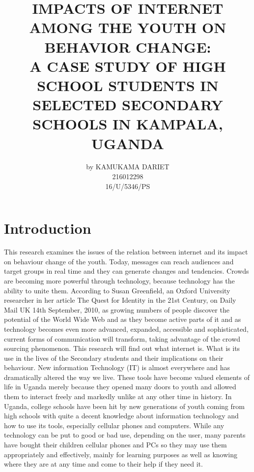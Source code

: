 \documentclass[10pt,letterpaper]{article}
\begin{document}
\title{IMPACTS OF INTERNET AMONG THE YOUTH ON BEHAVIOR CHANGE:\\ 
A CASE STUDY OF HIGH SCHOOL STUDENTS IN SELECTED SECONDARY SCHOOLS IN KAMPALA, UGANDA
}
\author{by KAMUKAMA DARIET  \\ 216012298 \\  16/U/5346/PS}
\maketitle
\section{Introduction }
This research examines the issues of the relation between internet and its impact on behaviour change of the youth. Today, messages can reach audiences and target groups in real time and they can generate changes and tendencies. Crowds are becoming more powerful through technology, because technology has the ability to unite them.
According to Susan Greenfield, an Oxford University researcher in her article The Quest for Identity in the 21st Century, on Daily Mail UK 14th September, 2010, as growing numbers of people discover the potential of the World Wide Web and as they become active parts of it and as technology becomes even more advanced, expanded, accessible and sophisticated, current forms of communication will transform, taking advantage of the crowd sourcing phenomenon.
This research will find out what internet is. What is its use in the lives of the Secondary students and their implications on their behaviour. New information Technology (IT) is almost everywhere and has dramatically altered the way we live. These tools have become valued elements of life in Uganda merely because they opened many doors to youth and allowed them to interact freely and markedly unlike at any other time in history. In Uganda, college schools have been hit by new generations of youth coming from high schools with quite a decent knowledge about information technology and how to use its tools, especially cellular phones and computers. While any technology can be put to good or bad use, depending on the user, many parents have bought their children cellular phones and PCs so they may use them appropriately and effectively, mainly for learning purposes as well as knowing where they are at any time and come to their help if they need it.
\end{document}

